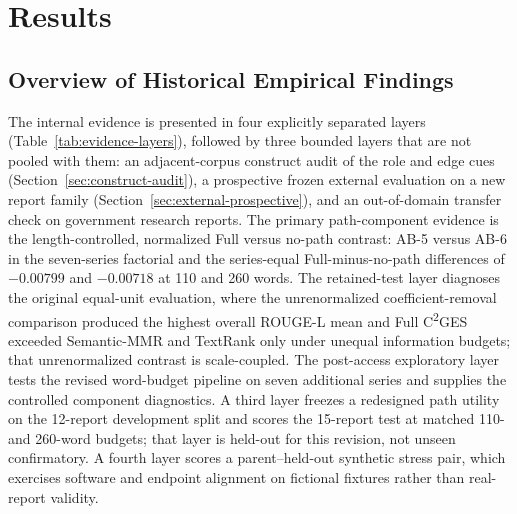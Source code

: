 \documentclass[information,article,submit,moreauthors]{Definitions/mdpi}
\newcommand{\cges}{C\textsuperscript{2}GES}
\begin{document}
\section{Results}

\subsection{Overview of Historical Empirical Findings}

The internal evidence is presented in four explicitly separated layers (Table~\ref{tab:evidence-layers}), followed by three bounded layers that are not pooled with them: an adjacent-corpus construct audit of the role and edge cues (Section~\ref{sec:construct-audit}), a prospective frozen external evaluation on a new report family (Section~\ref{sec:external-prospective}), and an out-of-domain transfer check on government research reports. The primary path-component evidence is the length-controlled, normalized Full versus no-path contrast: AB-5 versus AB-6 in the seven-series factorial and the series-equal Full-minus-no-path differences of $-0.00799$ and $-0.00718$ at 110 and 260 words. The retained-test layer diagnoses the original equal-unit evaluation, where the unrenormalized coefficient-removal comparison produced the highest overall ROUGE-L mean and Full \cges{} exceeded Semantic-MMR and TextRank only under unequal information budgets; that unrenormalized contrast is scale-coupled. The post-access exploratory layer tests the revised word-budget pipeline on seven additional series and supplies the controlled component diagnostics. A third layer freezes a redesigned path utility on the 12-report development split and scores the 15-report test at matched 110- and 260-word budgets; that layer is held-out for this revision, not unseen confirmatory. A fourth layer scores a parent--held-out synthetic stress pair, which exercises software and endpoint alignment on fictional fixtures rather than real-report validity.
\end{document}
